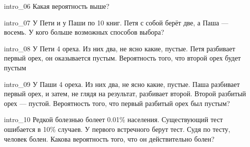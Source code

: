 \documentclass{article}
\begin{document}
\begin{question}{intro_06}
Какая вероятность выше?
  \begin{choices}
  \end{choices}
\end{question}


\begin{question}{intro_07}
У Пети и у Паши по 10 книг. Петя с собой берёт две, а Паша --- восемь. У кого больше возможных способов выбора?
  \begin{choiceshoriz}
  \end{choiceshoriz}
\end{question}


\begin{question}{intro_08}
У Пети 4 ореха. Из них два, не ясно какие, пустые. Петя разбивает первый орех, он оказывается пустым. Вероятность того, что второй орех будет пустым
  \begin{choiceshoriz}
  \end{choiceshoriz}
\end{question}


\begin{question}{intro_09}
У Паши 4 ореха. Из них два, не ясно какие, пустые. Паша разбивает первый орех, и затем, не глядя на результат, разбивает второй. Второй разбитый орех --- пустой. Вероятность того, что первый разбитый орех был пустым?
  \begin{choiceshoriz}
  \end{choiceshoriz}
\end{question}


\begin{question}{intro_10}
Редкой болезнью болеет 0.01\% населения. Существующий тест ошибается в 10\% случаев. У первого встречного берут тест. Судя по тесту, человек болен. Какова вероятность того, что он действительно болен?
  \begin{choiceshoriz}
  \end{choiceshoriz}
\end{question}
\end{document}
